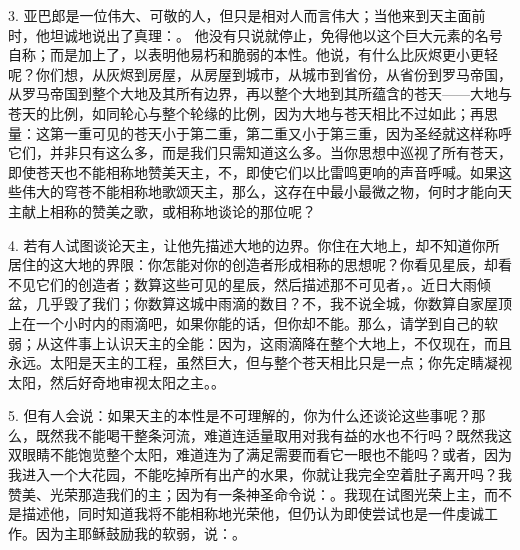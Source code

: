 3. 亚巴郎是一位伟大、可敬的人，但只是相对人而言伟大；当他来到天主面前时，他坦诚地说出了真理：。 他没有只说就停止，免得他以这个巨大元素的名号自称；而是加上了，以表明他易朽和脆弱的本性。他说，有什么比灰烬更小更轻呢？你们想，从灰烬到房屋，从房屋到城市，从城市到省份，从省份到罗马帝国，从罗马帝国到整个大地及其所有边界，再以整个大地到其所蕴含的苍天——大地与苍天的比例，如同轮心与整个轮缘的比例，因为大地与苍天相比不过如此；再思量：这第一重可见的苍天小于第二重，第二重又小于第三重，因为圣经就这样称呼它们，并非只有这么多，而是我们只需知道这么多。当你思想中巡视了所有苍天，即使苍天也不能相称地赞美天主，不，即使它们以比雷鸣更响的声音呼喊。如果这些伟大的穹苍不能相称地歌颂天主，那么，这存在中最小最微之物，何时才能向天主献上相称的赞美之歌，或相称地谈论的那位呢？\par

4. 若有人试图谈论天主，让他先描述大地的边界。你住在大地上，却不知道你所居住的这大地的界限：你怎能对你的创造者形成相称的思想呢？你看见星辰，却看不见它们的创造者；数算这些可见的星辰，然后描述那不可见者，。近日大雨倾盆，几乎毁了我们；你数算这城中雨滴的数目？不，我不说全城，你数算自家屋顶上在一个小时内的雨滴吧，如果你能的话，但你却不能。那么，请学到自己的软弱；从这件事上认识天主的全能：因为，这雨滴降在整个大地上，不仅现在，而且永远。太阳是天主的工程，虽然巨大，但与整个苍天相比只是一点；你先定睛凝视太阳，然后好奇地审视太阳之主。。\par

5. 但有人会说：如果天主的本性是不可理解的，你为什么还谈论这些事呢？那么，既然我不能喝干整条河流，难道连适量取用对我有益的水也不行吗？既然我这双眼睛不能饱览整个太阳，难道连为了满足需要而看它一眼也不能吗？或者，因为我进入一个大花园，不能吃掉所有出产的水果，你就让我完全空着肚子离开吗？我赞美、光荣那造我们的主；因为有一条神圣命令说：。我现在试图光荣上主，而不是描述他，同时知道我将不能相称地光荣他，但仍认为即使尝试也是一件虔诚工作。因为主耶稣鼓励我的软弱，说：。\par

